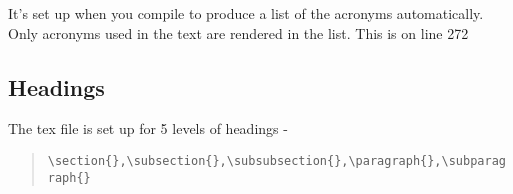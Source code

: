\documentclass[11pt,a4paper]{article}
\begin{document}
It's set up when you compile to produce a list of the acronyms automatically. Only acronyms used in the text are rendered in the list. This is on line 272

\subsection*{Headings}
The tex file is set up for 5 levels of headings - 
\begin{quote}
    \verb=\section{},\subsection{},\subsubsection{},\paragraph{},\subparagraph{}=
\end{quote}
\end{document}
